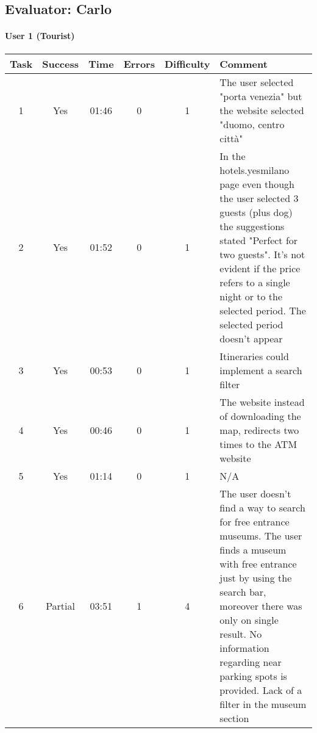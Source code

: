 \begin{small}
\pagebreak

\subsection{Evaluator: Carlo}

\paragraph{User 1 (Tourist)}
\begin{tabularx}{\linewidth}{c c c c c X}
    \toprule
    \textbf{Task} & \textbf{Success} & \textbf{Time}
     & \textbf{Errors} & \textbf{Difficulty} & \textbf{Comment} \\
    \midrule
    1 & Yes & 01:46 & 0 & 1 & The user selected "porta venezia" but the website selected "duomo, centro citt\`a" \\ \midrule
    2 & Yes & 01:52 & 0 & 1 & In the hotels.yesmilano page even though the user selected 3 guests (plus dog) the suggestions stated "Perfect for two guests". It's not evident if the price refers to a single night or to the selected period. The selected period doesn't appear \\ \midrule
    3 & Yes & 00:53 & 0 & 1 & Itineraries could implement a search filter \\ \midrule
    4 & Yes & 00:46 & 0 & 1 & The website instead of downloading the map, redirects two times to the ATM website \\ \midrule
    5 & Yes & 01:14 & 0 & 1 & N/A \\ \midrule
    6 & Partial & 03:51 & 1 & 4 & The user doesn't find a way to search for free entrance museums. The user finds a museum with free entrance just by using the search bar, moreover there was only on single result. No information regarding near parking spots is provided. Lack of a filter in the museum section \\ \bottomrule
\end{tabularx}


\end{small}
